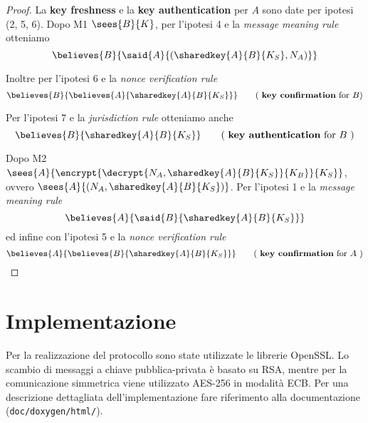 \documentclass[a4paper]{article}
\begin{document}
\begin{proof}
La {\bf key freshness} e la {\bf key authentication} per $A$ sono date per ipotesi (2, 5, 6).
Dopo M1 $\sees{B}{K}$, per l'ipotesi 4 e la {\em message meaning rule} otteniamo
\[
\believes{B}{ \said{A}{( \sharedkey{A}{B}{K_S}, N_A )} }
\]

Inoltre per l'ipotesi 6 e la {\em nonce verification rule}
\[
\believes{B}{ \believes{A}{ \sharedkey{A}{B}{K_S} } }   \tag{ {\bf key confirmation} for $B$}
\]

Per l'ipotesi 7 e la {\em jurisdiction rule} otteniamo anche
\[
\believes{B}{ \sharedkey{A}{B}{K_S} } \tag{ {\bf key authentication} for $B$ }
\]

Dopo M2 $\sees{A}{ \encrypt{ \decrypt{N_A,\sharedkey{A}{B}{K_S}}{K_B} }{K_S} }$, ovvero $\sees{A}{ (N_A,\sharedkey{A}{B}{K_S}) }$. Per l'ipotesi 1 e la {\em message meaning rule}
\[
\believes{A}{ \said{B}{ \sharedkey{A}{B}{K_S} } }
\]
ed infine con l'ipotesi 5 e la {\em nonce verification rule}
\[
\believes{A}{ \believes{B}{ \sharedkey{A}{B}{K_S} } } \tag{ {\bf key confirmation} for $A$ }
\]
\end{proof}


\section{Implementazione}
Per la realizzazione del protocollo sono state utilizzate le librerie OpenSSL. Lo scambio di messaggi a chiave pubblica-privata è basato su RSA, mentre per la comunicazione simmetrica viene utilizzato AES-256 in modalità ECB. Per una descrizione dettagliata dell'implementazione fare riferimento alla documentazione ({\tt doc/doxygen/html/}).
\end{document}

